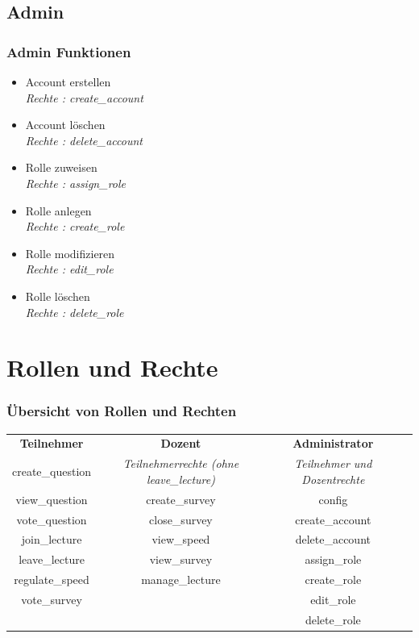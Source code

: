 \documentclass[german,a4paper]{beamer}
\begin{document}
\subsection{Admin}
\begin{frame} 
\frametitle{Admin Funktionen}
\begin{itemize}
  \item{}
  Account erstellen \\
  \quad \emph{Rechte : create\_account}
  \item{} 
  Account l\"{o}schen  \\
  \quad \emph{Rechte : delete\_account}
  \item{} 
  Rolle zuweisen  \\
  \quad \emph{Rechte : assign\_role}
  \item{} 
  Rolle anlegen  \\
  \quad \emph{Rechte : create\_role}
  \item{} 
  Rolle modifizieren  \\
  \quad \emph{Rechte : edit\_role}
  \item{} 
  Rolle l\"{o}schen  \\
  \quad \emph{Rechte : delete\_role}
\end{itemize}
\end{frame}

\section{Rollen und Rechte}
\begin{frame} 
\frametitle{\"{U}bersicht von Rollen und Rechten}
\resizebox{11,5cm}{!} {
  \begin{tabular}{c<{\onslide<2->} c<{\onslide<3->}c<{\onslide}c}
  \textbf{Teilnehmer} & \textbf{Dozent} & \textbf{Administrator} \\
  create\_question  & \emph{Teilnehmerrechte (ohne leave\_lecture)} & \emph{Teilnehmer und Dozentrechte} \\
  view\_question & create\_survey & config \\
  vote\_question & close\_survey & create\_account\\
  join\_lecture & view\_speed & delete\_account \\
  leave\_lecture & view\_survey & assign\_role \\
  regulate\_speed & manage\_lecture & create\_role \\
  vote\_survey & & edit\_role \\
  & & delete\_role \\
  \end{tabular}
}
\end{frame}
\end{document}
